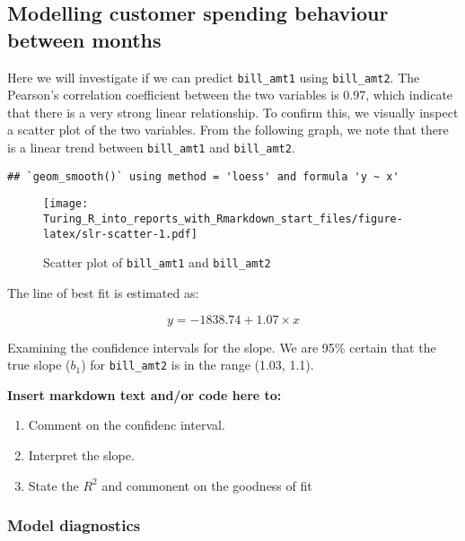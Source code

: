 \documentclass[
]{article}
\providecommand{\tightlist}{%
  \setlength{\itemsep}{0pt}\setlength{\parskip}{0pt}}
\begin{document}
\hypertarget{modelling-customer-spending-behaviour-between-months}{%
\subsection{Modelling customer spending behaviour between
months}\label{modelling-customer-spending-behaviour-between-months}}

Here we will investigate if we can predict \texttt{bill\_amt1} using
\texttt{bill\_amt2}. The Pearson's correlation coefficient between the
two variables is 0.97, which indicate that there is a very strong linear
relationship. To confirm this, we visually inspect a scatter plot of the
two variables. From the following graph, we note that there is a linear
trend between \texttt{bill\_amt1} and \texttt{bill\_amt2}.

\begin{verbatim}
## `geom_smooth()` using method = 'loess' and formula 'y ~ x'
\end{verbatim}

\begin{figure}
\centering
\texttt{[image: Turing\_R\_into\_reports\_with\_Rmarkdown\_start\_files/figure-latex/slr-scatter-1.pdf]}
\caption{Scatter plot of \texttt{bill\_amt1} and \texttt{bill\_amt2}}
\end{figure}

The line of best fit is estimated as:

\[ y = -1838.74 + 1.07\times x \]

Examining the confidence intervals for the slope. We are 95\% certain
that the true slope (\(b_1\)) for \texttt{bill\_amt2} is in the range
(1.03, 1.1).

\textbf{Insert markdown text and/or code here to:}

\begin{enumerate}
\def\labelenumi{\arabic{enumi}.}
\tightlist
\item
  Comment on the confidenc interval.
\item
  Interpret the slope.
\item
  State the \(R^2\) and commonent on the goodness of fit
\end{enumerate}

\newpage

\hypertarget{model-diagnostics}{%
\subsubsection{Model diagnostics}\label{model-diagnostics}}
\end{document}
